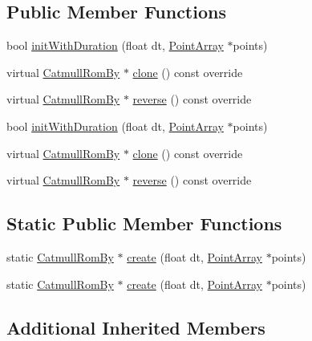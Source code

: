 \subsection*{Public Member Functions}
\begin{DoxyCompactItemize}
\item 
bool \hyperlink{classCatmullRomBy_a4bb8a1b728fbe433583cabe1f62c436d}{init\+With\+Duration} (float dt, \hyperlink{classPointArray}{Point\+Array} $\ast$points)
\item 
virtual \hyperlink{classCatmullRomBy}{Catmull\+Rom\+By} $\ast$ \hyperlink{classCatmullRomBy_a972f2e516b44eaa141ae270f575024e5}{clone} () const override
\item 
virtual \hyperlink{classCatmullRomBy}{Catmull\+Rom\+By} $\ast$ \hyperlink{classCatmullRomBy_a2f027f2c6627f98ffcc75a64ff6b0cd0}{reverse} () const override
\item 
bool \hyperlink{classCatmullRomBy_a4bb8a1b728fbe433583cabe1f62c436d}{init\+With\+Duration} (float dt, \hyperlink{classPointArray}{Point\+Array} $\ast$points)
\item 
virtual \hyperlink{classCatmullRomBy}{Catmull\+Rom\+By} $\ast$ \hyperlink{classCatmullRomBy_aea28e624bd562521e444af38384470aa}{clone} () const override
\item 
virtual \hyperlink{classCatmullRomBy}{Catmull\+Rom\+By} $\ast$ \hyperlink{classCatmullRomBy_ab489930d039c543d5965637ed50420d3}{reverse} () const override
\end{DoxyCompactItemize}
\subsection*{Static Public Member Functions}
\begin{DoxyCompactItemize}
\item 
static \hyperlink{classCatmullRomBy}{Catmull\+Rom\+By} $\ast$ \hyperlink{classCatmullRomBy_a160dd33d583d05632b51e21e95ccfd9b}{create} (float dt, \hyperlink{classPointArray}{Point\+Array} $\ast$points)
\item 
static \hyperlink{classCatmullRomBy}{Catmull\+Rom\+By} $\ast$ \hyperlink{classCatmullRomBy_a4a2372ed25deb3f953815767a2ed2df7}{create} (float dt, \hyperlink{classPointArray}{Point\+Array} $\ast$points)
\end{DoxyCompactItemize}
\subsection*{Additional Inherited Members}


